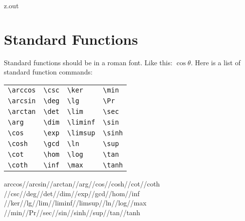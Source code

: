 \begin{VerbatimOut}{z.out}
\newpage

\section{Standard Functions}

Standard functions should be in a roman font.
Like this: \(\cos\theta\).
Here is a list of standard function commands:

\begin{inlinetable}
  \begin{tabular}{@{}llll@{}}
    \verb+\arccos+& \verb+\csc+& \verb+\ker+&    \verb+\min+\\
    \verb+\arcsin+& \verb+\deg+& \verb+\lg+&     \verb+\Pr+\\
    \verb+\arctan+& \verb+\det+& \verb+\lim+&    \verb+\sec+\\
    \verb+\arg+&    \verb+\dim+& \verb+\liminf+& \verb+\sin+\\
    \verb+\cos+&    \verb+\exp+& \verb+\limsup+& \verb+\sinh+\\
    \verb+\cosh+&   \verb+\gcd+& \verb+\ln+&     \verb+\sup+\\
    \verb+\cot+&    \verb+\hom+& \verb+\log+&    \verb+\tan+\\
    \verb+\coth+&   \verb+\inf+& \verb+\max+&    \verb+\tanh+\\
  \end{tabular}
  \ix
  {%
    arccos//arcsin//arctan//arg//cos//cosh//cot//coth%
    //csc//deg//det//dim//exp//gcd//hom//inf%
    //ker//lg//lim//liminf//limsup//ln//log//max%
    //min//Pr//sec//sin//sinh//sup//tan//tanh%
  }
  \index{\verb+\arccos+} \index{\verb+\arcsin+} \index{\verb+\arctan+} \index{\verb+\arg+}
  \index{\verb+\cos+} \index{\verb+\cosh+} \index{\verb+\cot+} \index{\verb+\coth+}
  \index{\verb+\csc+} \index{\verb+\deg+} \index{\verb+\det+} \index{\verb+\dim+}
  \index{\verb+\exp+} \index{\verb+\gcd+} \index{\verb+\hom+} \index{\verb+\inf+}
  \index{\verb+\ker+} \index{\verb+\lg+} \index{\verb+\lim+} \index{\verb+\liminf+}
  \index{\verb+\limsup+} \index{\verb+\ln+} \index{\verb+\log+} \index{\verb+\max+}
  \index{\verb+\min+} \index{\verb+\Pr+} \index{\verb+\sec+} \index{\verb+\sin+}
  \index{\verb+\sinh+} \index{\verb+\sup+} \index{\verb+\tan+} \index{\verb+\tanh+}
\end{inlinetable}
\end{VerbatimOut}

\MyIO


